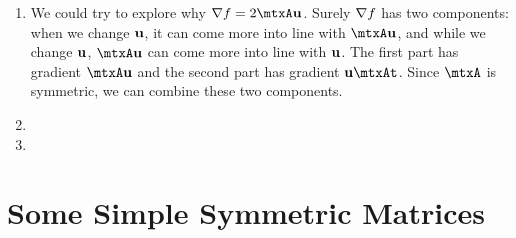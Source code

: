 \documentclass[11pt, oneside]{amsart}
\begin{document}
\begin{enumerate}
  \item We could try to explore why $\grad f = 2 \mtxA\vu$. Surely
  $\nabla f$ has two components: when we change $\bm{\mathrm{u}}$, it can come more
  into line with $\mtxA\vu$, and while we change $\bm{\mathrm{u}}$, $\mtxA\vu$ can
  come more into line with $\bm{\mathrm{u}}$. The first part has gradient $\mtxA\vu$
  and the second part has gradient $\vu\mtxAt$. Since $\mtxA$ is
  symmetric, we can combine these two components.

  \item {}

  \item {}
\end{enumerate}


\section{Some Simple Symmetric Matrices}
\end{document}
